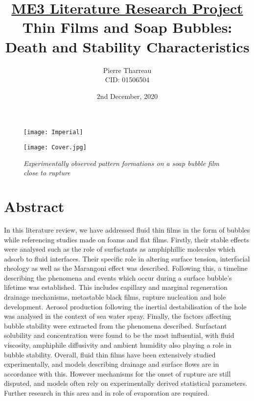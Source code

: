 \documentclass[a4paper,12pt]{article}
\numberwithin{equation}{section}
\numberwithin{figure}{section}
\numberwithin{table}{section}
\begin{document}
\begin{figure} [t]
    \texttt{[image: Imperial]}
\end{figure}



\title{\large \underline{ME3 Literature Research Project} \\ \huge Thin Films and Soap Bubbles: Death and Stability Characteristics}

\date{2nd December, 2020}
\author{Pierre Tharreau \\ CID: 01506504}
\maketitle

\begin{figure} [h]
    \centering
    \captionsetup{width=.9\linewidth}
    \texttt{[image: Cover.jpg]}
    \caption*{\textit{Experimentally observed pattern formations on a soap bubble film close to rupture \cite{Shen2020}}}
\end{figure}


\newpage
{}

\section*{Abstract}
In this literature review, we have addressed fluid thin films in the form of bubbles while referencing studies made on foams and flat films. Firstly, their stable effects were analysed such as the role of surfactants as amphiphillic molecules which adsorb to fluid interfaces. Their specific role in altering surface tension, interfacial rheology as well as the Marangoni effect was described. Following this, a timeline describing the phenomena and events which occur during a surface bubble's lifetime was established. This includes capillary and marginal regeneration drainage mechanisms, metastable black films, rupture nucleation and hole development. Aerosol production following the inertial destabilisation of the hole was analysed in the context of sea water spray. Finally, the factors affecting bubble stability were extracted from the phenomena described. Surfactant solubility and concentration were found to be the most influential, with fluid viscosity, amphiphile diffusivity and ambient humidity also playing a role in bubble stability. Overall, fluid thin films have been extensively studied experimentally, and models describing drainage and surface flows are in accordance with this. However mechanisms for the onset of rupture are still disputed, and models often rely on experimentally derived statistical parameters. Further research in this area and in role of evaporation are required.
\end{document}
